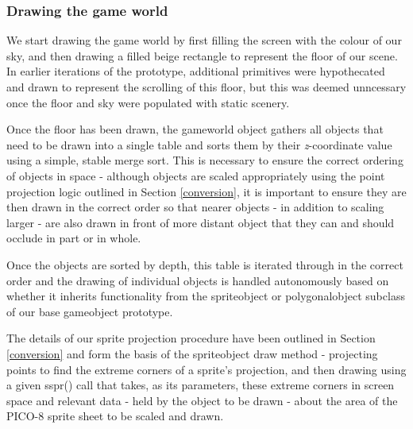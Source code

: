 \documentclass[11pt]{article}
\begin{document}
\subsubsection*{Drawing the game world}

We start drawing the game world by first filling the screen with the colour of our sky, and then 
drawing a filled beige rectangle to represent the floor of our scene. In earlier iterations of the
prototype, additional primitives were hypothecated and drawn to represent the scrolling of this floor,
but this was deemed unncessary once the floor and sky were populated with static scenery.

Once the floor has been drawn, the game\textunderscore world object gathers all objects that need to be
drawn into a single table and sorts them by their \textit{z}-coordinate value using a simple, stable
merge sort. This is necessary to ensure the correct ordering of objects in space - although objects
are scaled appropriately using the point projection logic outlined in Section \ref{conversion}, it
is important to ensure they are then drawn in the correct order so that nearer objects - in addition
to scaling larger - are also drawn in front of more distant object that they can and should occlude in
part or in whole.


Once the objects are sorted by depth, this table is iterated through in the correct order and the
drawing of individual objects is handled autonomously based on whether it inherits functionality
from the sprite\textunderscore object or polygonal\textunderscore object subclass of our
base game\textunderscore object prototype.

The details of our sprite projection procedure have been outlined in Section \ref{conversion} and
form the basis of the sprite\textunderscore object draw method - projecting points to find the
extreme corners of a sprite's projection, and then drawing using a given sspr() call that takes,
as its parameters, these extreme corners in screen space and relevant data - held by the object to
be drawn - about the area of the PICO-8 sprite sheet to be scaled and drawn.
\end{document}
